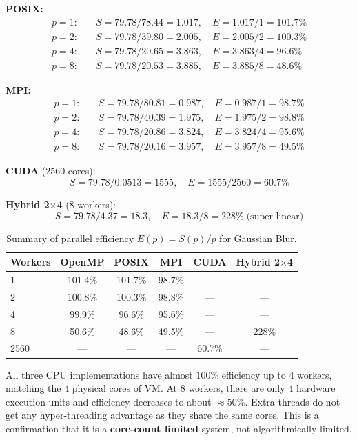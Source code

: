 ﻿\documentclass[12pt,a4paper]{article}
\begin{document}
\textbf{POSIX:}
\begin{align*}
  p=1:&\quad S = 79.78/78.44 = 1.017,\quad E = 1.017/1 = 101.7\% \\
  p=2:&\quad S = 79.78/39.80 = 2.005,\quad E = 2.005/2 = 100.3\% \\
  p=4:&\quad S = 79.78/20.65 = 3.863,\quad E = 3.863/4 = 96.6\% \\
  p=8:&\quad S = 79.78/20.53 = 3.885,\quad E = 3.885/8 = 48.6\%
\end{align*}

\textbf{MPI:}
\begin{align*}
  p=1:&\quad S = 79.78/80.81 = 0.987,\quad E = 0.987/1 = 98.7\% \\
  p=2:&\quad S = 79.78/40.39 = 1.975,\quad E = 1.975/2 = 98.8\% \\
  p=4:&\quad S = 79.78/20.86 = 3.824,\quad E = 3.824/4 = 95.6\% \\
  p=8:&\quad S = 79.78/20.16 = 3.957,\quad E = 3.957/8 = 49.5\%
\end{align*}

\textbf{CUDA} (2560 cores):
\[
  S = 79.78/0.0513 = 1555,\quad E = 1555/2560 = 60.7\%
\]

\textbf{Hybrid 2$\times$4} (8 workers):
\[
  S = 79.78/4.37 = 18.3,\quad E = 18.3/8 = 228\%\;\text{(super-linear)}
\]

\begin{table}[H]
\centering
\caption{Summary of parallel efficiency $E(p) = S(p)/p$ for Gaussian Blur.}
\label{tab:efficiency}
\begin{tabular}{lccccc}
\toprule
\textbf{Workers} & \textbf{OpenMP} & \textbf{POSIX} & \textbf{MPI} & \textbf{CUDA} & \textbf{Hybrid 2$\times$4} \\
\midrule
1 & 101.4\% & 101.7\% & 98.7\% & --- & --- \\
2 & 100.8\% & 100.3\% & 98.8\% & --- & --- \\
4 & 99.9\%  & 96.6\% & 95.6\% & --- & --- \\
8 & 50.6\%  & 48.6\%  & 49.5\% & --- & 228\% \\
2560 & --- & --- & --- & 60.7\% & --- \\
\bottomrule
\end{tabular}
\end{table}

All three CPU implementations have almost $100\%$ efficiency
up to 4 workers, matching the 4 physical cores of VM. At 8 workers,
there are only 4 hardware execution units and efficiency decreases to about $\approx50\%$.
Extra threads do not get any hyper-threading advantage as they share the same cores.
This is a confirmation that it is a \textbf{core-count limited} system, not algorithmically
limited.
\end{document}
